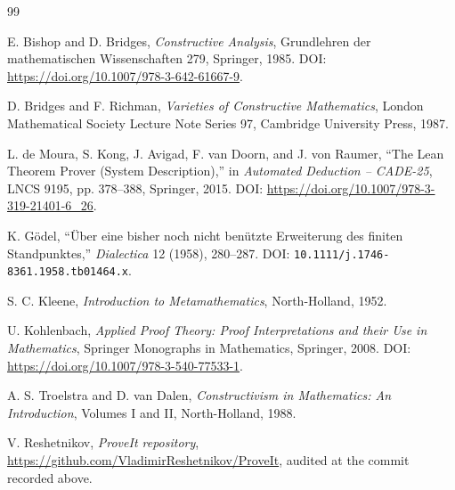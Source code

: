 \begin{thebibliography}{99}

E. Bishop and D. Bridges,
\emph{Constructive Analysis},
Grundlehren der mathematischen Wissenschaften 279,
Springer, 1985.
DOI: \url{https://doi.org/10.1007/978-3-642-61667-9}.

D. Bridges and F. Richman,
\emph{Varieties of Constructive Mathematics},
London Mathematical Society Lecture Note Series 97,
Cambridge University Press, 1987.

L. de Moura, S. Kong, J. Avigad, F. van Doorn, and J. von Raumer,
``The Lean Theorem Prover (System Description),''
in \emph{Automated Deduction -- CADE-25}, LNCS 9195,
pp. 378--388, Springer, 2015.
DOI: \url{https://doi.org/10.1007/978-3-319-21401-6_26}.

K. G\"odel,
``\"Uber eine bisher noch nicht ben\"utzte Erweiterung des finiten Standpunktes,''
\emph{Dialectica} 12 (1958), 280--287.
\newline DOI: \nolinkurl{10.1111/j.1746-8361.1958.tb01464.x}.

S. C. Kleene,
\emph{Introduction to Metamathematics},
North-Holland, 1952.

U. Kohlenbach,
\emph{Applied Proof Theory: Proof Interpretations and their Use in Mathematics},
Springer Monographs in Mathematics, Springer, 2008.
DOI: \url{https://doi.org/10.1007/978-3-540-77533-1}.

A. S. Troelstra and D. van Dalen,
\emph{Constructivism in Mathematics: An Introduction}, Volumes I and II,
North-Holland, 1988.

V. Reshetnikov,
\emph{ProveIt repository},
\url{https://github.com/VladimirReshetnikov/ProveIt},
audited at the commit recorded above.

\end{thebibliography}
